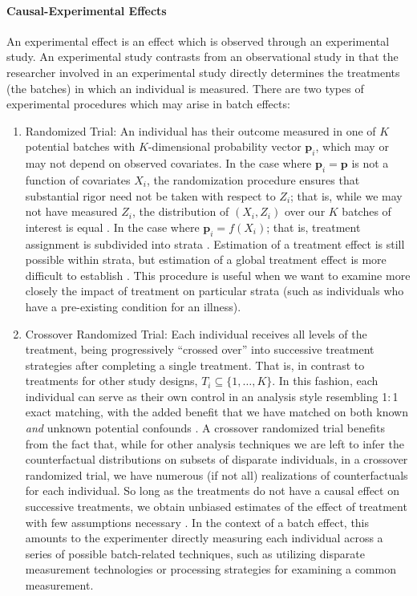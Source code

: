 \paragraph{Causal-Experimental Effects}
An experimental effect is an effect which is observed through an experimental study. An experimental study contrasts from an observational study in that the researcher involved in an experimental study directly determines the treatments (the batches) in which an individual is measured. There are two types of experimental procedures which may arise in batch effects:
\begin{enumerate}
    \item Randomized Trial: An individual has their outcome measured in one of $K$ potential batches with $K$-dimensional probability vector $\pmb p_i$, which may or may not depend on observed covariates. In the case where $\pmb p_i = \pmb p$ is not a function of covariates $X_i$, the randomization procedure ensures that substantial rigor need not be taken with respect to $Z_i$; that is, while we may not have measured $Z_i$, the distribution of $(X_i, Z_i)$ over our $K$ batches of interest is equal \cite{Imai2008Mar}. In the case where $\pmb p_i = f(X_i)$; that is, treatment assignment is subdivided into strata \cite{Fisher1935}. Estimation of a treatment effect is still possible within strata, but estimation of a global treatment effect is more difficult to establish \cite{Imai2008Mar}. This procedure is useful when we want to examine more closely the impact of treatment on particular strata (such as individuals who have a pre-existing condition for an illness).
    \item Crossover Randomized Trial: Each individual receives all levels of the treatment, being progressively ``crossed over'' into successive treatment strategies after completing a single treatment. That is, in contrast to treatments for other study designs, $T_i \subseteq \{1, \hdots, K\}$. In this fashion, each individual can serve as their own control in an analysis style resembling 1$:$1 exact matching, with the added benefit that we have matched on both known \textit{and} unknown potential confounds \cite{Jones2003,Senn2002Aug}. A crossover randomized trial benefits from the fact that, while for other analysis techniques we are left to infer the counterfactual distributions on subsets of disparate individuals, in a crossover randomized trial, we have numerous (if not all) realizations of counterfactuals for each individual. So long as the treatments do not have a causal effect on successive treatments, we obtain unbiased estimates of the effect of treatment with few assumptions necessary \cite{Jones2003}. In the context of a batch effect, this amounts to the experimenter directly measuring each individual across a series of possible batch-related techniques, such as utilizing disparate measurement technologies or processing strategies for examining a common measurement.
\end{enumerate}
